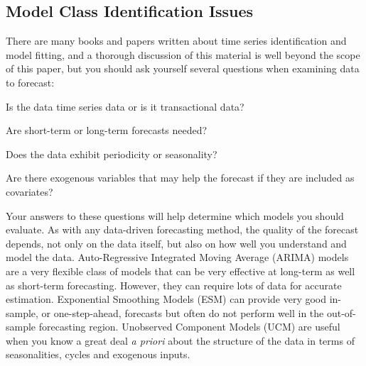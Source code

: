 \documentclass[10pt]{sugconf-ish}
\begin{document}
\subsection{Model Class Identification Issues}
There are many books and papers written about time series identification and model fitting, and a thorough discussion of this material is well beyond the scope of this paper, but you should ask yourself several questions when examining data to forecast:
\begin{list}{\textbullet}{\setlength{\itemsep}{0pt}\setlength{\topsep}{0pt}
  \setlength{\parsep}{0pt}}
\item Is the data time series data or is it transactional data?
\item Are short-term or long-term forecasts needed?
\item Does the data exhibit periodicity or seasonality?
\item Are there exogenous variables that may help the forecast if they are included as covariates?   
\end{list}
Your answers to these questions will help determine which models you should evaluate. As with any data-driven forecasting method, the quality of the forecast depends, not only on the data itself, but also on how well you understand and model the data.
Auto-Regressive Integrated Moving Average (ARIMA) models are a very flexible class of models that can be very effective at long-term as well as short-term forecasting. However, they can require lots of data for accurate estimation.
Exponential Smoothing Models (ESM) can provide very good in-sample, or one-step-ahead, forecasts but often do not perform well in the out-of-sample forecasting region.
Unobserved Component Models (UCM) are useful when you know a great deal \emph{a priori} about the structure of the data in terms of seasonalities, cycles and exogenous inputs.
\end{document}
